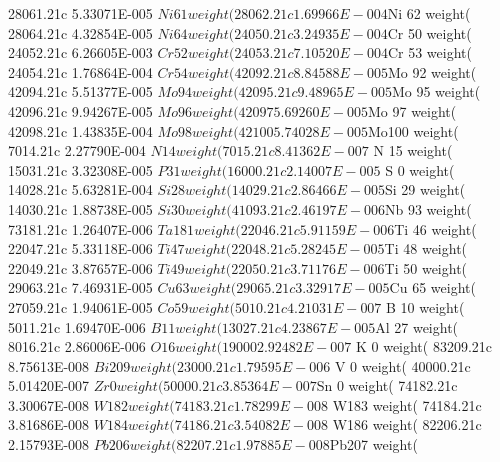 \begin{python}
28061.21c 5.33071E-005 $Ni 61 weight(%
28062.21c 1.69966E-004 $Ni 62 weight(%
28064.21c 4.32854E-005 $Ni 64 weight(%
24050.21c 3.24935E-004 $Cr 50 weight(%
24052.21c 6.26605E-003 $Cr 52 weight(%
24053.21c 7.10520E-004 $Cr 53 weight(%
24054.21c 1.76864E-004 $Cr 54 weight(%
42092.21c 8.84588E-005 $Mo 92 weight(%
42094.21c 5.51377E-005 $Mo 94 weight(%
42095.21c 9.48965E-005 $Mo 95 weight(%
42096.21c 9.94267E-005 $Mo 96 weight(%
42097 5.69260E-005 $Mo 97 weight(%
42098.21c 1.43835E-004 $Mo 98 weight(%
42100 5.74028E-005 $Mo100 weight(%
7014.21c 2.27790E-004 $ N 14 weight(%
7015.21c 8.41362E-007 $ N 15 weight(%
15031.21c 3.32308E-005 $ P 31 weight(%
16000.21c 2.14007E-005 $ S  0 weight(%
14028.21c 5.63281E-004 $Si 28 weight(%
14029.21c 2.86466E-005 $Si 29 weight(%
14030.21c 1.88738E-005 $Si 30 weight(%
41093.21c 2.46197E-006 $Nb 93 weight(%
73181.21c 1.26407E-006 $Ta181 weight(%
22046.21c 5.91159E-006 $Ti 46 weight(%
22047.21c 5.33118E-006 $Ti 47 weight(%
22048.21c 5.28245E-005 $Ti 48 weight(%
22049.21c 3.87657E-006 $Ti 49 weight(%
22050.21c 3.71176E-006 $Ti 50 weight(%
29063.21c 7.46931E-005 $Cu 63 weight(%
29065.21c 3.32917E-005 $Cu 65 weight(%
27059.21c 1.94061E-005 $Co 59 weight(%
5010.21c 4.21031E-007 $ B 10 weight(%
5011.21c 1.69470E-006 $ B 11 weight(%
13027.21c 4.23867E-005 $Al 27 weight(%
8016.21c 2.86006E-006 $ O 16 weight(%
19000 2.92482E-007 $ K  0 weight(%
83209.21c 8.75613E-008 $Bi209 weight(%
23000.21c 1.79595E-006 $ V  0 weight(%
40000.21c 5.01420E-007 $Zr  0 weight(%
50000.21c 3.85364E-007 $Sn  0 weight(%
74182.21c 3.30067E-008 $ W182 weight(%
74183.21c 1.78299E-008 $ W183 weight(%
74184.21c 3.81686E-008 $ W184 weight(%
74186.21c 3.54082E-008 $ W186 weight(%
82206.21c 2.15793E-008 $Pb206 weight(%
82207.21c 1.97885E-008 $Pb207 weight(%

\end{python}
